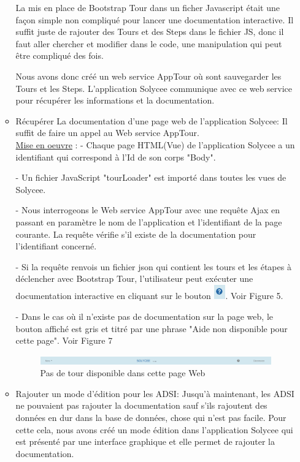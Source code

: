 \documentclass[12pt]{article}
\begin{document}
\begin{enumerate}
\begin{itemize}
La mis en place de Bootstrap Tour dans un ficher Javascript était une façon simple non compliqué pour lancer une documentation interactive. Il suffit juste de rajouter des Tours et des Steps dans le fichier JS, donc il faut aller chercher et modifier dans le code, une manipulation qui peut être compliqué des fois.

Nous avons donc créé un web service AppTour où sont sauvegarder les Tours et les Steps. L'application Solycee communique avec ce web service pour récupérer les informations et la documentation. \\ 

\item  Récupérer La documentation d'une page web de l'application Solycee: Il suffit de faire un appel au Web service AppTour. \\   
 
\underline{Mise en oeuvre} :
- Chaque page HTML(Vue) de l'application Solycee a un identifiant qui correspond à l'Id de son corps "Body".

- Un fichier JavaScript "tourLoader" est importé dans toutes les vues de Solycee.

- Nous interrogeons le Web service AppTour avec une requête Ajax en passant en paramètre le nom de l'application et l'identifiant de la page courante. La requête vérifie s'il existe de la documentation pour l’identifiant concerné. 

- Si la requête renvois un fichier json qui contient les tours et les étapes à déclencher avec Bootstrap Tour, l'utilisateur peut exécuter une documentation interactive en cliquant sur le bouton \includegraphics[width=5mm,scale=0.5]{diagrammes/Bouton_aideDispo.png}. Voir Figure 5.    

- Dans le cas où il n'existe pas de documentation sur la page web, le bouton affiché est gris et titré par une phrase "Aide non disponible pour cette page". Voir Figure 7 \\
\begin{figure}[H]
	\centering
 		\includegraphics[width=1\textwidth]{diagrammes/aideNonDispo.png} 
  		\caption{Pas de tour disponible dans cette page Web }
	\end{figure}
    
\item  Rajouter un mode d'édition pour les ADSI: Jusqu'à maintenant, les ADSI ne pouvaient pas rajouter la documentation sauf s'ils rajoutent des données en dur dans la base de données, chose qui n'est pas facile. Pour cette cela, nous avons créé un mode édition dans l'application Solycee qui est présenté par une interface graphique et elle  permet de rajouter la documentation.\\



\end{itemize}
\end{enumerate}
\end{document}
